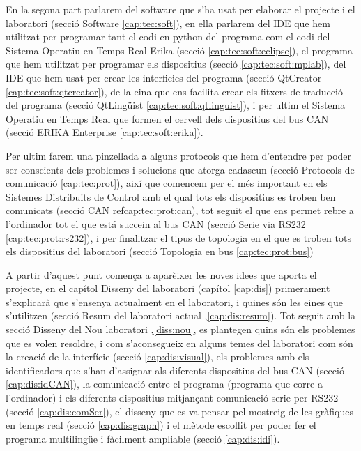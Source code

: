 En la segona part parlarem del software que s'ha usat per elaborar el projecte i el laboratori (secció Software \ref{cap:tec:soft}), en ella parlarem del IDE que hem utilitzat per programar tant el codi en python del programa \DCSMonitor com el codi del Sistema Operatiu en Temps Real Erika (secció \Eclipse \ref{cap:tec:soft:eclipse}), el programa que hem utilitzat per programar els dispositius (secció \MplabX \ref{cap:tec:soft:mplab}), del IDE que hem usat per crear les interficies del programa \DCSMonitor (secció QtCreator \ref{cap:tec:soft:qtcreator}), de la eina que ens facilita crear els fitxers de traducció del programa \DCSMonitor (secció QtLingüist \ref{cap:tec:soft:qtlinguist}), i per ultim el Sistema Operatiu en Temps Real que formen el cervell dels dispositius del bus CAN (secció ERIKA Enterprise \ref{cap:tec:soft:erika}).

Per ultim farem una pinzellada a alguns protocols que hem d'entendre per poder ser conscients dels problemes i solucions que atorga cadascun (secció Protocols de comunicació \ref{cap:tec:prot}), així que comencem per el més important en els Sistemes Distribuits de Control amb el qual tots els dispositius es troben ben comunicats (secció CAN ref{cap:tec:prot:can}), tot seguit el que ens permet rebre a l'ordinador tot el que está succein al bus CAN (secció Serie via RS232 \ref{cap:tec:prot:rs232}), i per finalitzar el tipus de topologia en el que es troben tots els dispositius del laboratori (secció Topologia en bus \ref{cap:tec:prot:bus})

A partir d'aquest punt comença a aparèixer les noves idees que aporta el projecte, en el capítol Disseny del laboratori (capítol \ref{cap:dis}) primerament s'explicarà que s'ensenya actualment en el laboratori, i quines són les eines que s'utilitzen (secció Resum del laboratori actual ,\ref{cap:dis:resum}). Tot seguit amb la secció Disseny del Nou laboratori ,\ref{diss:nou}, es plantegen quins són els problemes que es volen resoldre, i com s'aconsegueix en alguns temes del laboratori com són la creació de la interfície (secció \ref{cap:dis:visual}), els problemes amb els identificadors que s'han d'assignar als diferents dispositius del bus CAN (secció \ref{cap:dis:idCAN}), la comunicació entre el programa \DCSMonitor (programa que corre a l'ordinador) i els diferents dispositius mitjançant comunicació serie per RS232 (secció \ref{cap:dis:comSer}), el disseny que es va pensar pel mostreig de les gràfiques en temps real (secció \ref{cap:dis:graph}) i el mètode escollit per poder fer el programa multilingüe i fàcilment ampliable (secció \ref{cap:dis:idi}).

